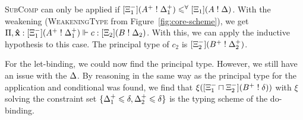 \textsc{SubComp} can only be applied if $[\Xi_1^-](A^+ \mathrel{!} \Delta^+_1) \leqslant^\forall [\Xi_1](A \mathrel{!} \Delta)$. With the weakening (\textsc{WeakeningType} from Figure~\ref{fig:core-scheme}), we get $\Pi, \textbf{\^{x}} \mathrel{:} [\Xi_1^-](A^+ \mathrel{!} \Delta^+_1) \Vdash c \mathrel{:} [\Xi_2](B \mathrel{!} \Delta_2)$. With this, we can apply the inductive hypothesis to this case. The principal type of $c_2$ is $[\Xi^-_2](B^+ \mathrel{!} \Delta^+_2)$.

For the let-binding, we could now find the principal type. However, we still have an issue with the $\Delta$. By reasoning in the same way as the principal type for the application and conditional was found, we find that $\xi([\Xi^-_1 \sqcap \Xi^-_2](B^+ \mathrel{!} \delta))$ with $\xi$ solving the constraint set $\{\Delta^+_1 \leqslant \delta, \Delta^+_2 \leqslant \delta\}$ is the typing scheme of the do-binding.


